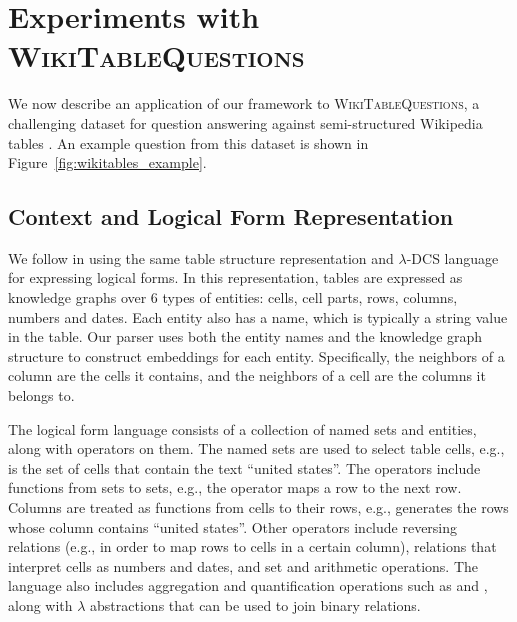\section{Experiments with \textsc{WikiTableQuestions}}
We now describe an application of our framework to \textsc{WikiTableQuestions}, 
a challenging dataset for question
answering against semi-structured Wikipedia tables 
\citep{pasupat2015compositional}. An example question from this dataset
is shown in Figure~\ref{fig:wikitables_example}.

\subsection{Context and Logical Form Representation}
\label{sec:preliminaries}

We follow \cite{pasupat2015compositional} in using the same table structure 
representation 
and $\lambda$-DCS language for expressing logical forms.
In this representation, tables are expressed as knowledge graphs over 6 types 
of 
entities: cells, cell parts, rows, columns, numbers and dates.
Each entity also has a name, which is typically a string value in the table.
Our parser uses both the entity names and the knowledge graph structure to 
construct embeddings for each entity. Specifically, the neighbors of a column 
are the cells it
contains, and the neighbors of a cell are the columns it belongs to.

The logical form language consists of a collection of named sets and entities, 
along with operators on them.
The named sets are used to select table cells, e.g.,  is 
the set of cells that contain the text ``united states''.
The operators include functions from sets to sets, e.g., the  
operator maps a row to the next row.
Columns are treated as functions from cells to their rows, e.g.,  generates the rows whose  column contains 
``united states''. 
Other operators include reversing relations (e.g., in order to map rows to 
cells 
in a certain column), relations that interpret cells as numbers and dates, and 
set and arithmetic operations. 
The language also includes aggregation and quantification operations such as 
 and , along with $\lambda$ abstractions that can be 
used to join binary relations.

